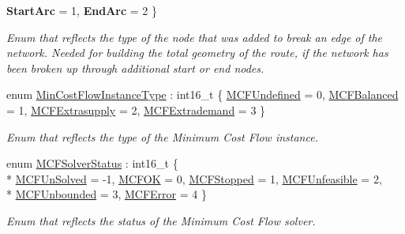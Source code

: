 \begin{DoxyCompactItemize}
{\bfseries Start\+Arc} = 1, 
{\bfseries End\+Arc} = 2
 \}\hypertarget{namespacenetxpert_1_1data_addf98eb51735356977db0de627cc38c1}{}\label{namespacenetxpert_1_1data_addf98eb51735356977db0de627cc38c1}
\begin{DoxyCompactList}\small\item\em Enum that reflects the type of the node that was added to break an edge of the network. Needed for building the total geometry of the route, if the network has been broken up through additional start or end nodes. \end{DoxyCompactList}
\item 
enum \hyperlink{namespacenetxpert_1_1data_a9504ea932b3debceb4ba7f6831e80bbd}{Min\+Cost\+Flow\+Instance\+Type} \+: int16\+\_\+t \{ \hyperlink{namespacenetxpert_1_1data_a9504ea932b3debceb4ba7f6831e80bbda0e13c6ec2b78ca3b8e8377ea89b53c2b}{M\+C\+F\+Undefined} = 0, 
\hyperlink{namespacenetxpert_1_1data_a9504ea932b3debceb4ba7f6831e80bbda0b605b19396fc3ed4d1f23b75bcc5a9e}{M\+C\+F\+Balanced} = 1, 
\hyperlink{namespacenetxpert_1_1data_a9504ea932b3debceb4ba7f6831e80bbda6826139a98d9671cff8ae7e98a9cef49}{M\+C\+F\+Extrasupply} = 2, 
\hyperlink{namespacenetxpert_1_1data_a9504ea932b3debceb4ba7f6831e80bbdab4655410af0f398a0ba3d4cdf84bd270}{M\+C\+F\+Extrademand} = 3
 \}\begin{DoxyCompactList}\small\item\em Enum that reflects the type of the Minimum Cost Flow instance. \end{DoxyCompactList}
\item 
enum \hyperlink{namespacenetxpert_1_1data_a0ea30f651c6cc7e7a6edd5a5cbe6346c}{M\+C\+F\+Solver\+Status} \+: int16\+\_\+t \{ \\*
\hyperlink{namespacenetxpert_1_1data_a0ea30f651c6cc7e7a6edd5a5cbe6346ca733cc2da2224ce6ccb9163cd7be0e748}{M\+C\+F\+Un\+Solved} = -\/1, 
\hyperlink{namespacenetxpert_1_1data_a0ea30f651c6cc7e7a6edd5a5cbe6346ca3cf3f94c6f56c9b7ec5c54c580d77bc3}{M\+C\+F\+OK} = 0, 
\hyperlink{namespacenetxpert_1_1data_a0ea30f651c6cc7e7a6edd5a5cbe6346caef7ee1a8cde55750ba03126a7dc34f96}{M\+C\+F\+Stopped} = 1, 
\hyperlink{namespacenetxpert_1_1data_a0ea30f651c6cc7e7a6edd5a5cbe6346ca78702b165ad82de50f63cf00498d17ed}{M\+C\+F\+Unfeasible} = 2, 
\\*
\hyperlink{namespacenetxpert_1_1data_a0ea30f651c6cc7e7a6edd5a5cbe6346cac92d71e95a9b3d967e1175e1165e2190}{M\+C\+F\+Unbounded} = 3, 
\hyperlink{namespacenetxpert_1_1data_a0ea30f651c6cc7e7a6edd5a5cbe6346ca2943143373d2c1ff4e0384d6d9635084}{M\+C\+F\+Error} = 4
 \}\begin{DoxyCompactList}\small\item\em Enum that reflects the status of the Minimum Cost Flow solver. \end{DoxyCompactList}

\end{DoxyCompactItemize}
